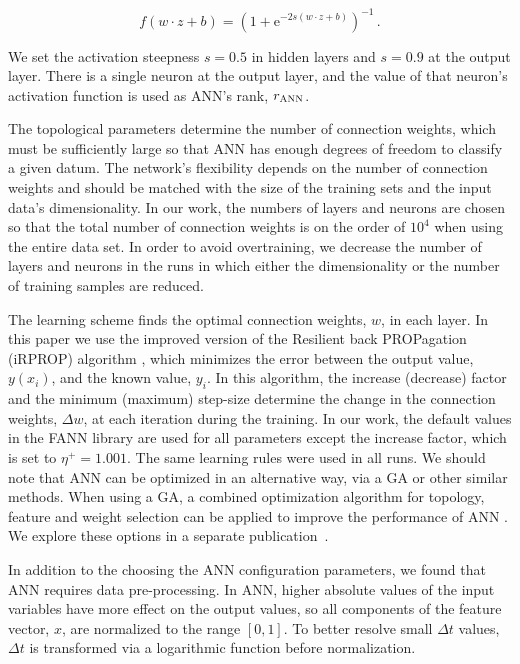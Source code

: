 \documentclass[prd, twocolumn, lengthcheck, superscriptaddress, showpacs, letterpaper, nofootinbib]{revtex4-1}
\newcommand\auxvec{x}
\newcommand\ANNrank{r_{\textsc{ANN}}}
\begin{document}
\begin{equation}\label{sigmoid}
f\left(w \cdot z + b\right)={\left(1+\mathrm{e}^{-2s(w \cdot z + b)}\right)}^{-1}\,.
\end{equation}

We set the activation steepness $s = 0.5$ in hidden layers and $s = 0.9$ at the output layer. There is a single neuron at the output layer, and the value of that neuron's activation function is used as ANN's rank, $\ANNrank$.

The topological parameters determine the number of connection weights, which must be sufficiently large so that \ac{ANN} has enough degrees of freedom to classify a given datum. The network's flexibility depends on the number of connection weights and should be matched with the size of the training sets and the input data's dimensionality. In our work, the numbers of layers and neurons are chosen so that the total number of connection weights is on the order of $10^4$ when using the entire data set. In order to avoid overtraining, we decrease the number of layers and neurons in the runs in which either the dimensionality or the number of training samples are reduced. 
 
The learning scheme finds the optimal connection weights, $w$, in each layer. In this paper we use the improved version of the Resilient back PROPagation (iRPROP) algorithm \cite{IgelHusk:2000}, which minimizes the error between the output value, $y(\auxvec_i)$, and the known value, $y_i$. In this algorithm, the increase (decrease) factor and the minimum (maximum) step-size determine the change in the connection weights, $\Delta w$, at each iteration during the training. In our work, the default values in the \ac{FANN} library \cite{fann} are used for all parameters except the increase factor, which is set to $\eta^{+}=1.001$. The same learning rules were used in all runs. We should note that \ac{ANN} can be optimized in an alternative way, via a \ac{GA} or other similar methods. When using a \ac{GA}, a combined optimization algorithm for topology, feature and weight selection can be applied to improve the performance of \ac{ANN} \cite{KozaRice:1991,DBLP:1992,ChangLipp:1991,Collins90anartificial,Gruau:1992}. We explore these options in a separate publication~\cite{Kim:2012}.

In addition to the choosing the \ac{ANN} configuration parameters, we found that \ac{ANN} requires data pre-processing. In \ac{ANN}, higher absolute values of the input variables have more effect on the output values, so all components of the feature vector, $\auxvec$, are normalized to the range $[0,1]$. To better resolve small $\Delta t$ values, $\Delta t$ is transformed via a logarithmic function before normalization.
\end{document}
